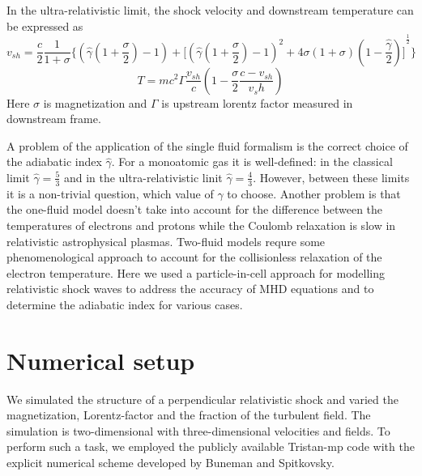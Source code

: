 \documentclass[a4paper]{jpconf}
\begin{document}
	In the ultra-relativistic limit, the shock velocity and downstream temperature can be expressed\cite{Amato2006,2011A&ARv..19...42B} as
	\begin{equation}\label{vshock}
	v_{sh} = \frac{c}{2}\frac{1}{1 + \sigma}\lbrace (\hat{\gamma}(1 + \frac{\sigma}{2})-1) + {\lbrack (\hat{\gamma}(1 + \frac{\sigma}{2})-1)^2 + 4\sigma(1+\sigma)(1 - \frac{\hat{\gamma}}{2})\rbrack}^{\frac{1}{2}} \rbrace
	\end{equation}
	\begin{equation}\label{temperature}
	T = m c^2 \Gamma \frac{v_{sh}}{c}(1 - \frac{\sigma}{2}\frac{c - v_{sh}}{v_sh})
	\end{equation}
	Here $\sigma$ is magnetization and $\Gamma$ is upstream lorentz factor measured in downstream frame.
	
	
	A problem of the application of the single fluid formalism is the correct choice of the adiabatic index $\hat{\gamma}$. For a monoatomic gas it is well-defined: in the classical limit $\hat{\gamma} = \frac{5}{3}$ and in the ultra-relativistic linit $\hat{\gamma} = \frac{4}{3}$. However, between these limits it is a non-trivial question, which value of $\hat{\gamma}$ to choose. Another problem is that the one-fluid model doesn't take into account for the difference between the temperatures of electrons and protons while the Coulomb relaxation is slow in relativistic astrophysical plasmas. Two-fluid models requre  some phenomenological approach to account for the collisionless relaxation of the electron temperature. Here we used a particle-in-cell approach for modelling relativistic shock waves to address the accuracy of MHD equations and to determine the adiabatic index for various cases.
	
	
	\section{Numerical setup}
	We simulated the structure of a perpendicular relativistic shock and varied the magnetization, Lorentz-factor and the fraction of the turbulent field. 
	The simulation is two-dimensional with three-dimensional velocities and fields. To perform such a task, we employed the publicly available Tristan-mp code with the explicit numerical scheme developed by Buneman \cite{Buneman93} and  Spitkovsky\cite{Spitkovsky2005}.
	
\end{document}
